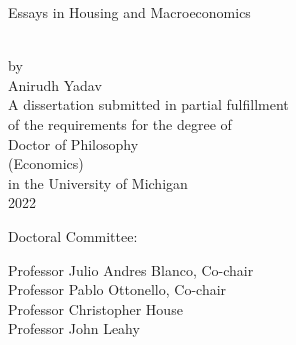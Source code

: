 \begin{titlepage}
 \begin{singlespace} %
  \hbox{\vspace{1.2in}} %
  \begin{center} %
   \begin{onehalfspacing}
    { Essays in Housing and Macroeconomics} %
   \end{onehalfspacing} \\[4ex] %
   by \\[2ex] %
   Anirudh Yadav \\ %
   \vfill %
   A dissertation submitted in partial fulfillment \\ %
   of the requirements for the degree of \\ %
   Doctor of Philosophy \\ %
   (Economics) \\ %
   in the University of Michigan \\ %
   2022 %
  \end{center} %
  \vfill %
  \begin{flushleft}
   \hspace{0.7in}Doctoral Committee: \\[2ex] %
   \hspace{1in} %
   \parbox{4.2in}{Professor Julio Andres Blanco, Co-chair\\
                  Professor Pablo Ottonello, Co-chair\\
                  Professor Christopher House\\
                  Professor John Leahy}
  \end{flushleft} %
 \end{singlespace} %
\end{titlepage}

\clearpage
\thispagestyle{empty}

\hspace{0pt}

\vfill

